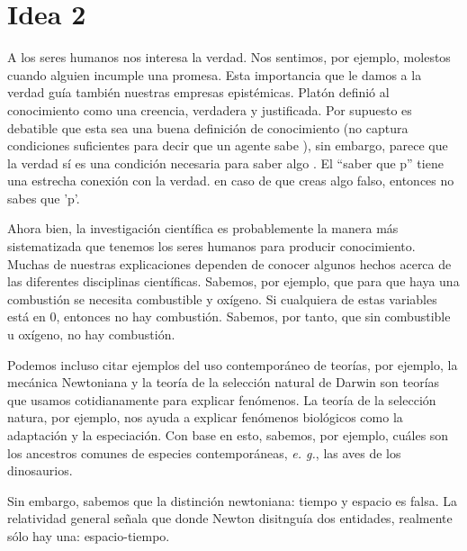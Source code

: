 \documentclass[12pt]{article}
\begin{document}
\section{Idea 2}

A los seres humanos nos interesa la verdad. Nos sentimos, por ejemplo, molestos cuando alguien incumple una promesa. Esta importancia que le damos a la verdad guía también nuestras empresas epistémicas. Platón \cite{} definió al conocimiento como una creencia, verdadera y justificada. Por supuesto es debatible que esta sea una buena definición de conocimiento (no captura condiciones suficientes para decir que un agente sabe \cite{gettier}), sin embargo, parece que la verdad sí es una condición necesaria para saber algo \cite{pritchard}. El ``saber que p'' tiene una estrecha conexión con la verdad. en caso de que creas algo falso, entonces no sabes que 'p'. 

Ahora bien, la investigación científica es probablemente la manera más sistematizada que tenemos los seres humanos para producir conocimiento. Muchas de nuestras explicaciones dependen de conocer algunos hechos acerca de las diferentes disciplinas científicas. Sabemos, por ejemplo, que para que haya una combustión se necesita combustible y oxígeno. Si cualquiera de estas variables está en 0, entonces no hay combustión. Sabemos, por tanto, que sin combustible u oxígeno, no hay combustión.

Podemos incluso citar ejemplos del uso contemporáneo de teorías, por ejemplo, la mecánica Newtoniana y la teoría de la selección natural de Darwin son teorías que usamos cotidianamente para explicar fenómenos. La teoría de la selección natura, por ejemplo, nos ayuda a explicar fenómenos biológicos como la adaptación y la especiación. Con base en esto, sabemos, por ejemplo, cuáles son los ancestros comunes de especies contemporáneas, \textit{e. g.}, las aves de los dinosaurios.

Sin embargo, sabemos que la distinción newtoniana: tiempo y espacio es falsa. La relatividad general señala que donde Newton disitnguía dos entidades, realmente sólo hay una: espacio-tiempo. 
\end{document}
